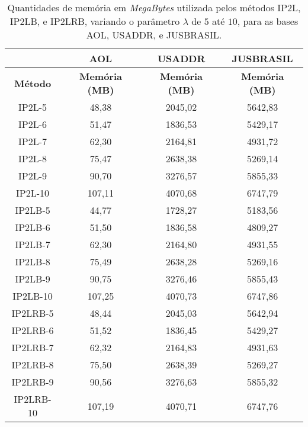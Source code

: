 \begin{table}[]
\centering
\begin{tabular}{c|c|c|c|}
\cline{2-4}
\multicolumn{1}{l|}{} & \textbf{AOL} & \textbf{USADDR} & \textbf{JUSBRASIL} \\ \hline
\multicolumn{1}{|c|}{\textbf{Método}} & \textbf{Memória (MB)} & \textbf{Memória (MB)} & \textbf{Memória (MB)} \\ \hline
\multicolumn{1}{|c|}{IP2L-5} & 48,38 & 2045,02 & 5642,83 \\ \hline
\multicolumn{1}{|c|}{IP2L-6} & 51,47 & 1836,53 & 5429,17 \\ \hline
\multicolumn{1}{|c|}{IP2L-7} & 62,30 & 2164,81 & 4931,72 \\ \hline
\multicolumn{1}{|c|}{IP2L-8} & 75,47 & 2638,38 & 5269,14 \\ \hline
\multicolumn{1}{|c|}{IP2L-9} & 90,70 & 3276,57 & 5855,33 \\ \hline
\multicolumn{1}{|c|}{IP2L-10} & 107,11 & 4070,68 & 6747,79 \\ \hline
\multicolumn{1}{|c|}{IP2LB-5} & 44,77 & 1728,27 & 5183,56 \\ \hline
\multicolumn{1}{|c|}{IP2LB-6} & 51,50 & 1836,58 & 4809,27 \\ \hline
\multicolumn{1}{|c|}{IP2LB-7} & 62,30 & 2164,80 & 4931,55 \\ \hline
\multicolumn{1}{|c|}{IP2LB-8} & 75,49 & 2638,28 & 5269,16 \\ \hline
\multicolumn{1}{|c|}{IP2LB-9} & 90,75 & 3276,46 & 5855,43 \\ \hline
\multicolumn{1}{|c|}{IP2LB-10} & 107,25 & 4070,73 & 6747,86 \\ \hline
\multicolumn{1}{|c|}{IP2LRB-5} & 48,44 & 2045,03 & 5642,94 \\ \hline
\multicolumn{1}{|c|}{IP2LRB-6} & 51,52 & 1836,45 & 5429,27 \\ \hline
\multicolumn{1}{|c|}{IP2LRB-7} & 62,32 & 2164,83 & 4931,63 \\ \hline
\multicolumn{1}{|c|}{IP2LRB-8} & 75,50 & 2638,39 & 5269,27 \\ \hline
\multicolumn{1}{|c|}{IP2LRB-9} & 90,56 & 3276,63 & 5855,32 \\ \hline
\multicolumn{1}{|c|}{IP2LRB-10} & 107,19 & 4070,71 & 6747,76 \\ \hline
\end{tabular}
\caption{Quantidades de memória em \textit{MegaBytes} utilizada pelos métodos IP2L, IP2LB, e IP2LRB, variando o parâmetro $\lambda$ de $5$ até $10$, para as bases AOL, USADDR, e JUSBRASIL.}
\label{tab:methods-memory-consumption}
\end{table}



